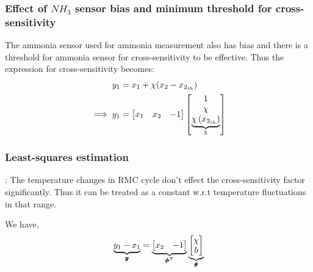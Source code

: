\subsubsection{Effect of $NH_3$ sensor bias and minimum threshold for cross-sensitivity}

The ammonia sensor used for ammonia measurement also has bias and there is a
threshold for ammonia sensor for cross-sensitivity to be effective. Thus the
expression for cross-sensitivity becomes:
\begin{align*}
    y_1 &= x_1 + \chi (x_2 - x_{2_{th}})\\
    \implies y_1 &= \begin{bmatrix} x_1 & x_2 & -1 \end{bmatrix} \begin{bmatrix}  1 \\ \chi \\ \underbrace{\chi \left( x_{2_{th}} \right)}_{b} \end{bmatrix}
\end{align*}

\subsubsection{Least-squares estimation}
: The temperature changes in RMC cycle don't effect the
cross-sensitivity factor significantly. Thus it can be treated as a constant
w.r.t temperature fluctuations in that range.

We have,
\begin{align*}
    \underbrace{y_1 - x_1}_{\pmb y} &= \underbrace{\begin{bmatrix} x_2 & -1 \end{bmatrix}}_{\pmb \phi^T} \underbrace{\begin{bmatrix}  \chi \\ b \end{bmatrix}}_{ \pmb \theta}\\
\end{align*}
